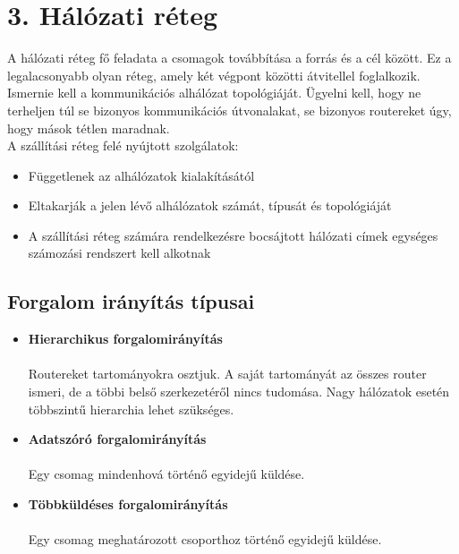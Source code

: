 \documentclass[12pt]{article}
\begin{document}
	\section*{3. Hálózati réteg}
		
    A hálózati réteg fő feladata a csomagok továbbítása a forrás és a cél között. Ez a legalacsonyabb olyan réteg, amely két végpont közötti átvitellel foglalkozik. Ismernie kell a kommunikációs alhálózat topológiáját. Ügyelni kell, hogy ne terheljen túl se bizonyos kommunikációs útvonalakat, se bizonyos routereket úgy, hogy mások tétlen maradnak.\\

    \noindent A szállítási réteg felé nyújtott szolgálatok:
    \begin{itemize}[leftmargin=7.5mm]
        \renewcommand{\labelitemi}{$\vcenter{\hbox{\tiny$\bullet$}}$}
        \item Függetlenek az alhálózatok kialakításától
        \item Eltakarják a jelen lévő alhálózatok számát, típusát és topológiáját
        \item A szállítási réteg számára rendelkezésre bocsájtott hálózati címek egységes számozási rendszert kell alkotnak
    \end{itemize}
	
    \subsection*{Forgalom irányítás típusai}

    \begin{itemize}[leftmargin=7.5mm]
        \renewcommand{\labelitemi}{$\vcenter{\hbox{\tiny$\bullet$}}$}
        \item \textbf{\small Hierarchikus forgalomirányítás}\\\\
        Routereket tartományokra osztjuk. A saját tartományát az összes router ismeri, de a többi belső szerkezetéről nincs tudomása. Nagy hálózatok esetén többszintű hierarchia lehet szükséges.
        \item \textbf{\small Adatszóró forgalomirányítás}\\\\
        Egy csomag mindenhová történő egyidejű küldése.
        \item \textbf{\small Többküldéses forgalomirányítás}\\\\
        Egy csomag meghatározott csoporthoz történő egyidejű küldése.
    \end{itemize}
\newpage
\end{document}
